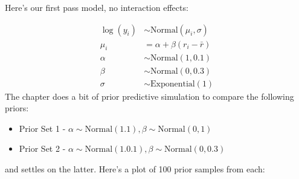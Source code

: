 \documentclass[
]{book}
\providecommand{\tightlist}{%
  \setlength{\itemsep}{0pt}\setlength{\parskip}{0pt}}
\begin{document}
Here's our first pass model, no interaction effects:

\[
\begin{aligned}
\log(y_i) &\sim \text{Normal}(\mu_i,\sigma)\\
\mu_i &= \alpha + \beta(r_i - \bar{r}) \\
\alpha &\sim \text{Normal}(1,0.1)\\
\beta &\sim \text{Normal}(0,0.3)\\
\sigma &\sim \text{Exponential}(1)
\end{aligned}
\]
The chapter does a bit of prior predictive simulation to compare the following priors:

\begin{itemize}
\tightlist
\item
  Prior Set 1 - \(\alpha \sim \text{Normal}(1.1), \beta \sim \text{Normal}(0,1)\)
\item
  Prior Set 2 - \(\alpha \sim \text{Normal}(1.0.1), \beta \sim \text{Normal}(0,0.3)\)
\end{itemize}

and settles on the latter. Here's a plot of 100 prior samples from each:
\end{document}
